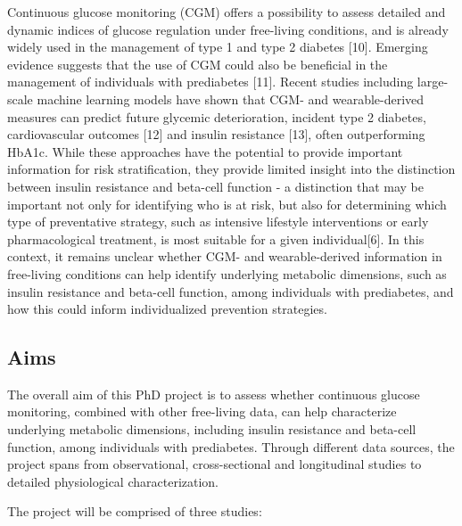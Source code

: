 \documentclass[
  12pt,
  letterpaper,
  DIV=11,
  numbers=noendperiod]{scrartcl}
\begin{document}
Continuous glucose monitoring (CGM) offers a possibility to assess
detailed and dynamic indices of glucose regulation under free-living
conditions, and is already widely used in the management of type 1 and
type 2 diabetes {[}10{]}. Emerging evidence suggests that the use of CGM
could also be beneficial in the management of individuals with
prediabetes {[}11{]}. Recent studies including large-scale machine
learning models have shown that CGM- and wearable-derived measures can
predict future glycemic deterioration, incident type 2 diabetes,
cardiovascular outcomes {[}12{]} and insulin resistance {[}13{]}, often
outperforming HbA1c. While these approaches have the potential to
provide important information for risk stratification, they provide
limited insight into the distinction between insulin resistance and
beta-cell function - a distinction that may be important not only for
identifying who is at risk, but also for determining which type of
preventative strategy, such as intensive lifestyle interventions or
early pharmacological treatment, is most suitable for a given
individual{[}6{]}. In this context, it remains unclear whether CGM- and
wearable-derived information in free-living conditions can help identify
underlying metabolic dimensions, such as insulin resistance and
beta-cell function, among individuals with prediabetes, and how this
could inform individualized prevention strategies.

\subsection{Aims}\label{aims}

The overall aim of this PhD project is to assess whether continuous
glucose monitoring, combined with other free-living data, can help
characterize underlying metabolic dimensions, including insulin
resistance and beta-cell function, among individuals with prediabetes.
Through different data sources, the project spans from observational,
cross-sectional and longitudinal studies to detailed physiological
characterization.

The project will be comprised of three studies:
\end{document}
